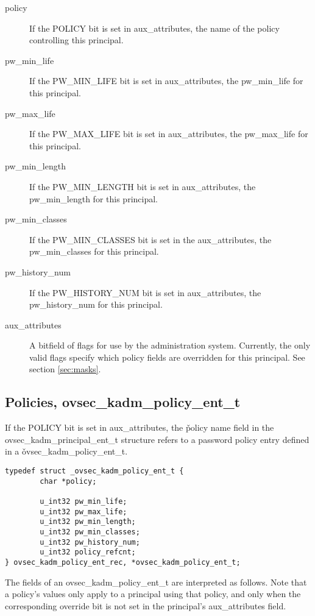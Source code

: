 \begin{description}
\item[policy] If the POLICY bit is set in aux_attributes, the name
of the policy controlling this principal.

\item[pw_min_life] If the PW_MIN_LIFE bit is set in aux_attributes,
the pw_min_life for this principal.

\item[pw_max_life] If the PW_MAX_LIFE bit is set in aux_attributes,
the pw_max_life for this principal.

\item[pw_min_length] If the PW_MIN_LENGTH bit is set in
aux_attributes, the pw_min_length for this principal.

\item[pw_min_classes] If the PW_MIN_CLASSES bit is set in the
aux_attributes, the pw_min_classes for this principal.

\item[pw_history_num] If the PW_HISTORY_NUM bit is set in
aux_attributes, the pw_history_num for this principal.

\item[aux_attributes]  A bitfield of flags for use by the
administration system.  Currently, the only valid flags specify which
policy fields are overridden for this principal.  See section
\ref{sec:masks}.
\end{description}

\subsection{Policies, ovsec_kadm_policy_ent_t}
\label{sec:policy-fields}

If the POLICY bit is set in aux_attributes, the \v{policy} name field
in the ovsec_kadm_principal_ent_t structure refers to a password
policy entry defined in a \v{ovsec_kadm_policy_ent_t}.

\begin{verbatim}
typedef struct _ovsec_kadm_policy_ent_t {
        char *policy;

        u_int32 pw_min_life;
        u_int32 pw_max_life;
        u_int32 pw_min_length;
        u_int32 pw_min_classes;
        u_int32 pw_history_num;
        u_int32 policy_refcnt;
} ovsec_kadm_policy_ent_rec, *ovsec_kadm_policy_ent_t;
\end{verbatim}

The fields of an ovsec_kadm_policy_ent_t are interpreted as follows.
Note that a policy's values only apply to a principal using that
policy, and only when the corresponding override bit is not set in the
principal's aux_attributes field.

